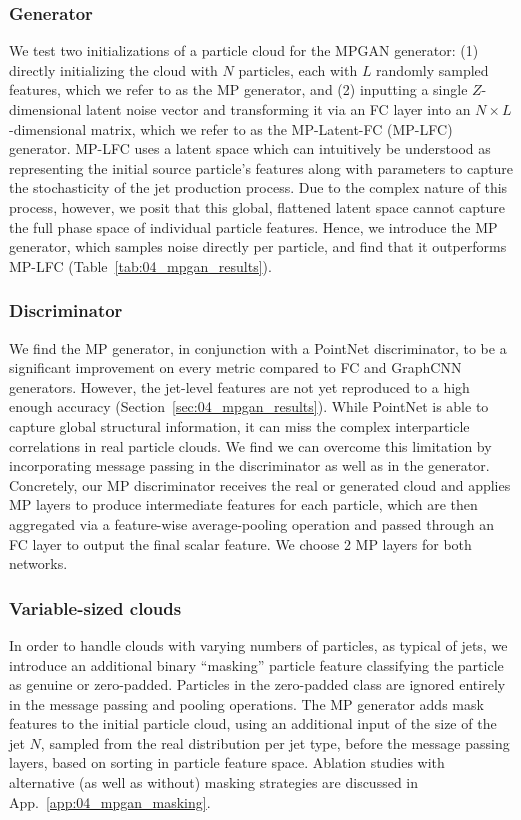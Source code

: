 \subsubsection{Generator}

We test two initializations of a particle cloud for the MPGAN generator: (1) directly initializing the cloud with $N$ particles, each with $L$ randomly sampled features, which we refer to as the MP generator, and (2) inputting a single $Z$-dimensional latent noise vector and transforming it via an FC layer into an $N\times L$-dimensional matrix, which we refer to as the MP-Latent-FC (MP-LFC) generator. 
MP-LFC uses a latent space which can intuitively be understood as representing the initial source particle's features along with parameters to capture the stochasticity of the jet production process.
Due to the complex nature of this process, however, we posit that this global, flattened latent space cannot capture the full phase space of individual particle features. 
Hence, we introduce the MP generator, which samples noise directly per particle, and find that it outperforms MP-LFC (Table~\ref{tab:04_mpgan_results}).

\subsubsection{Discriminator}

We find the MP generator, in conjunction with a PointNet discriminator, to be a significant improvement on every metric compared to FC and GraphCNN generators.
However, the jet-level features are not yet reproduced to a high enough accuracy (Section~\ref{sec:04_mpgan_results}).
While PointNet is able to capture global structural information, it can miss the complex interparticle correlations in real particle clouds.
We find we can overcome this limitation by incorporating message passing in the discriminator as well as in the generator.
Concretely, our MP discriminator receives the real or generated cloud and applies MP layers to produce intermediate features for each particle, which are then aggregated via a feature-wise average-pooling operation and passed through an FC layer to output the final scalar feature.
We choose 2 MP layers for both networks. 

\subsubsection{Variable-sized clouds}

In order to handle clouds with varying numbers of particles, as typical of jets, we introduce an additional binary ``masking'' particle feature classifying the particle as genuine or zero-padded. 
Particles in the zero-padded class are ignored entirely in the message passing and pooling operations. 
The MP generator adds mask features to the initial particle cloud, using an additional input of the size of the jet $N$, sampled from the real distribution per jet type, before the message passing layers, based on sorting in particle feature space. 
Ablation studies with alternative (as well as without) masking strategies are discussed in App.~\ref{app:04_mpgan_masking}.

